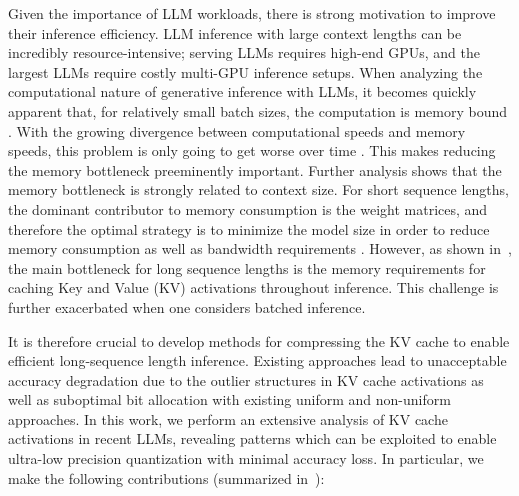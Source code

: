 Given the importance of LLM workloads, there is strong motivation to improve their inference efficiency. LLM inference with large context lengths can be incredibly resource-intensive; serving LLMs requires high-end GPUs, and the largest LLMs require costly multi-GPU inference setups. When analyzing the computational nature of generative inference with LLMs, it becomes quickly apparent that, for relatively small batch sizes, the computation is memory bound \cite{kim2023squeezellm}. With the growing divergence between computational speeds and memory speeds, this problem is only going to get worse over time \cite{gholami2020ai_and_memory_wall}. This makes reducing the memory bottleneck preeminently important. Further analysis shows that the memory bottleneck is strongly related to context size. For short sequence lengths, the dominant contributor to memory consumption is the weight matrices, and therefore the optimal strategy is to minimize the model size in order to reduce memory consumption as well as bandwidth requirements \cite{kim2023full,kim2023squeezellm}. However, as shown in~, the main bottleneck for long sequence lengths is the memory requirements for caching Key and Value (KV) activations throughout inference. This challenge is further exacerbated when one considers batched inference.

It is therefore crucial to develop methods for compressing the KV cache to enable efficient long-sequence length inference. Existing approaches lead to unacceptable accuracy degradation due to the outlier structures in KV cache activations as well as suboptimal bit allocation with existing uniform and non-uniform approaches. In this work, we perform an extensive analysis of KV cache activations in recent LLMs, revealing patterns which can be exploited to enable ultra-low precision quantization with minimal accuracy loss. In particular, we make the following contributions (summarized in~):

